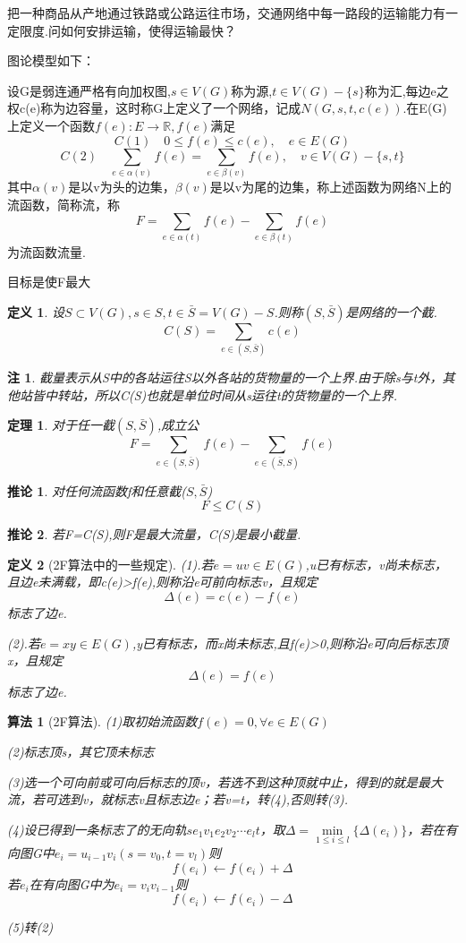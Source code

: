 \documentclass[UTF8]{ctexart}
\newtheorem{dfnt}{定义}
\newtheorem{thr}{定理}
\newtheorem*{coro}{推论}
\newtheorem*{note}{注}
\newtheorem{alg}{算法}
\begin{document}
把一种商品从产地通过铁路或公路运往市场，交通网络中每一路段的运输能力有一定限度.问如何安排运输，使得运输最快？

图论模型如下：

设G是弱连通严格有向加权图,$s \in V(G)$称为源,$t \in V(G) -\{s\}$称为汇,每边e之权c(e)称为边容量，这时称G上定义了一个网络，记成$N(G,s,t,c(e))$.在E(G)上定义一个函数$f(e):E \rightarrow \mathbb{R},f(e)$满足\[C(1) \quad 0\leq f(e)\leq c(e), \quad e \in E(G)\] \[C(2) \quad \sum_{e \in \alpha(v)} f(e) = \sum_{e\in \beta(v)} f(e),\quad v \in V(G)-\{s,t\}\]其中$\alpha(v)$是以v为头的边集，$\beta(v)$是以v为尾的边集，称上述函数为网络N上的流函数，简称流，称$$F=\sum_{e\in \alpha(t)}f(e)-\sum_{e\in \beta(t)}f(e)$$为流函数流量.

目标是使F最大
\begin{dfnt}
设$S \subset V(G),s \in S,t \in \bar{S}=V(G)-S$.则称$(S,\bar{S})$是网络的一个截.\[C(S) = \sum_{e\in (S,\bar{S})}c(e)\]
\end{dfnt}
\begin{note}
截量表示从S中的各站运往S以外各站的货物量的一个上界.由于除s与t外，其他站皆中转站，所以C(S)也就是单位时间从s运往t的货物量的一个上界.
\end{note}
\begin{thr}
对于任一截$(S,\bar{S})$,成立公\[F = \sum_{e \in (S,\bar{S})}f(e) - \sum_{e\in (\bar{S},S)} f(e)\]
\end{thr}
\begin{coro}
对任何流函数f和任意截($S,\bar{S}$)\[F \leq C(S)\]
\end{coro}
\begin{coro}
若F=C(S),则F是最大流量，C(S)是最小截量.
\end{coro}
\begin{dfnt}[2F算法中的一些规定]
\item (1).若$e=uv \in E(G)$,u已有标志，v尚未标志，且边e未满载，即c(e)>f(e),则称沿e可前向标志v，且规定$$\Delta (e) = c(e)-f(e)$$标志了边e.
\item (2).若$e=xy \in E(G)$,y已有标志，而x尚未标志,且f(e)>0,则称沿e可向后标志顶x，且规定$$\Delta (e) = f(e)$$标志了边e.
\end{dfnt}
\begin{alg}[2F算法]
\item (1)取初始流函数$f(e) = 0,\forall e \in E(G)$
\item (2)标志顶s，其它顶未标志
\item (3)选一个可向前或可向后标志的顶v，若选不到这种顶就中止，得到的就是最大流，若可选到v，就标志v且标志边e；若v=t，转(4),否则转(3).
\item (4)设已得到一条标志了的无向轨$se_1v_1e_2v_2\cdots e_lt$，取$\Delta = \min \limits_{1 \leq i\leq l}\{\Delta (e_i)\}$，若在有向图G中$e_i=u_{i-1}v_i(s=v_0,t=v_l)$则\[f(e_i)\leftarrow f(e_i)+\Delta \]若$e_i$在有向图G中为$e_i = v_iv_{i-1}$则\[f(e_i)\leftarrow f(e_i)-\Delta\]
\item (5)转(2)
\end{alg}
\end{document}

